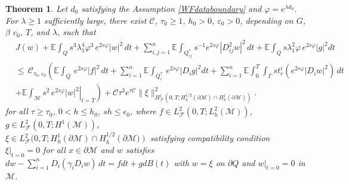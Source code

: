 \documentclass[11pt,oneside,leqno]{amsart}
\numberwithin{equation}{section}
\numberwithin{equation}{section}
\newcommand{\E}{\mathbb{E}}
\newtheorem{theorem}{Theorem}[section]
\begin{document}
\begin{theorem}\label{theo: CarlemanNonhomgeneous.}
    Let $d_0$ satisfying the Assumption \ref{WFdataboundary} and $\varphi=e^{\lambda d_0}$. For $\lambda\geq 1$ sufficiently large, there exist $\mathcal{C}$, $\tau_{0}\geq 1$, $h_{0}>0$, $\varepsilon_0 >0$, depending on $G$,$\beta$ $c_{0}$, $T$, and $\lambda$, such that 
\begin{equation}\label{eq:secondCarleman}
\begin{split}
&J(w)+\E\int_{Q}s^{3}\lambda^{4}_{1}\varphi^{3}\,e^{2s\varphi}|w|^{2}\,dt+\sum_{i,j=1}^{n}\E\int_{Q_{ij}^\ast}s^{-1}e^{2s\varphi}|D_{ij}^2w|^2\, dt+\E\int_{Q}s\lambda_{1}^2\varphi\,e^{2s\varphi}|g|^2dt\\
&\leq\,\mathcal{C}_{\tau_{0},\varepsilon_0}\left(\E\int_{Q}\,e^{2s\varphi}|f|^2\,dt+\sum_{i=1}^{n}\E\int_{Q_i^{\ast}}\,e^{2s\varphi}|D_{i}g|^2dt+\sum_{i=1}^{n}\E\int_0^T 
\int_{\Gamma}st_{r}^{i}(e^{2s\varphi}|D_iw|^2)\,dt\right.\\
&\left.+\left.\E\int_{\mathcal{M}}s^2\,e^{2s\varphi}|w|^2\right|_{t=T}\right)+\mathcal{C}\tau^3e^{\tau\mathcal{C}}\|\xi\|^2_{H_{\mathcal{F}}^{1}(0,T;H_{h}^{1/2}(\partial\mathcal{M})\cap H_{h}^1(\partial\mathcal{M}))}.
\end{split}
\end{equation}
for all $\tau\geq \tau_0$, $0<h\leq h_0$, $sh\leq \epsilon_0$, where $f\in L^{2}_{\mathcal{F}}(0,T;L_h^2(\mathcal{M}))$, $g\in L^{2}_{\mathcal{F}}(0,T;H^1(\mathcal{M}))$,\\
$\xi\in L^2_{\mathcal{F}}(0,T;H_h^1(\partial\mathcal{M})\cap H_{h}^{1/2}(\partial \mathcal{M)})$ satisfying compatibility condition $\left.\xi\right|_{t=0}=0$ for all $x\in\partial\mathcal{M}$  and $w$ satisfies $dw-{ \sum_{i=1}^{n}} D_i(\gamma_i D_{i}w)\,dt=fdt+gdB(t)$ with $w=\xi$ on $\partial Q$ and $\left.w\right|_{t=0}=0$ in $\mathcal{M}$.
\end{theorem}
\end{document}
